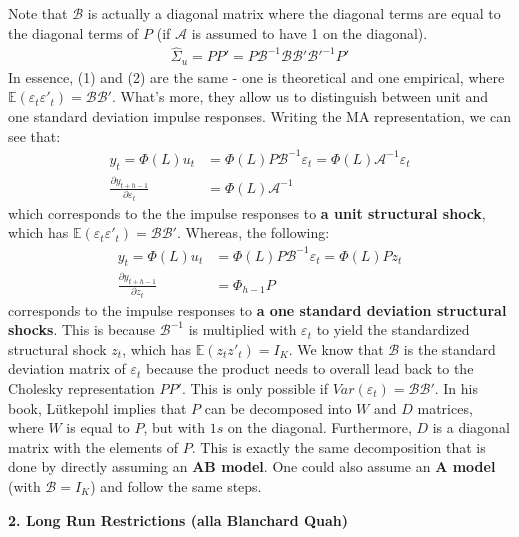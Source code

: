 \documentclass[a4paper, 12pt]{article}
\begin{document}
Note that $\mathcal{B}$ is actually a diagonal matrix where the diagonal terms are equal to the diagonal terms of $P$ (if $\mathcal{A}$ is assumed to have 1 on the diagonal).
\begin{equation}
\begin{aligned}
\hat{\Sigma}_u=PP'=P\mathcal{B}^{-1}\mathcal{B}\mathcal{B}'\mathcal{B}'^{-1}P' 
\end{aligned}
\end{equation}
In essence, (1) and (2) are the same - one is theoretical and one empirical, where $\mathbb{E}(\varepsilon_t\varepsilon'_t)=\mathcal{B}\mathcal{B}'$. What's more, they allow us to distinguish between unit and one standard deviation impulse responses. Writing the MA representation, we can see that:
\begin{equation}
\begin{aligned}
y_t=\Phi(L)u_{t}&=\Phi(L)P\mathcal{B}^{-1}\varepsilon_t=\Phi(L)\mathcal{A}^{-1}\varepsilon_t\nonumber \\
\frac{\partial y_{t+h-1}}{\partial \varepsilon_{t}}&=\Phi(L)\mathcal{A}^{-1} \nonumber
\end{aligned}
\end{equation}
which corresponds to the the impulse responses to \textbf{a unit structural shock}, which has $\mathbb{E}(\varepsilon_t\varepsilon'_t)=\mathcal{B}\mathcal{B}'$. Whereas, the following:
\begin{equation}
\begin{aligned}
y_t=\Phi(L)u_{t}&=\Phi(L)P\mathcal{B}^{-1}\varepsilon_t=\Phi(L)Pz_t\nonumber \\
\frac{\partial y_{t+h-1}}{\partial z_{t}}&=\Phi_{h-1}P \nonumber
\end{aligned}
\end{equation}
corresponds to the impulse responses to \textbf{a one standard deviation structural shocks}. This is because $\mathcal{B}^{-1}$ is multiplied with $\varepsilon_t$ to yield the standardized structural shock $z_t$, which has $\mathbb{E}(z_tz'_t)=I_{K}$.
We know that $\mathcal{B}$ is the standard deviation matrix of $\varepsilon_t$ because the product needs to overall lead back to the Cholesky representation $PP'$. This is only possible if $Var(\varepsilon_t)=\mathcal{B}\mathcal{B}'$. 
In his book, Lütkepohl implies that $P$ can be decomposed into $W$ and $D$ matrices, where $W$ is equal to $P$, but with $1s$ on the diagonal. Furthermore, $D$ is a diagonal matrix with the elements of $P$. 
This is exactly the same decomposition that is done by directly assuming an \textbf{AB model}. One could also assume an \textbf{A model} (with $\mathcal{B}=I_K$) and follow the same steps. 
\begin{center}
\textbf{2. Long Run Restrictions (alla Blanchard Quah)}
\end{center}
\end{document}
